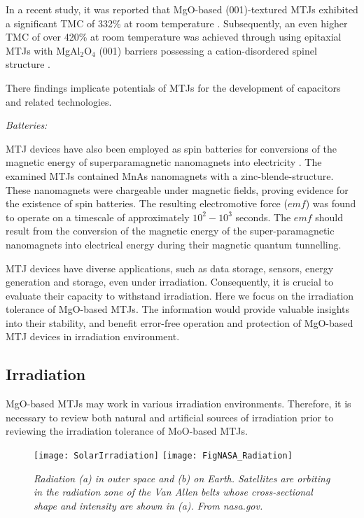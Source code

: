 \documentclass[molecules,review,submit,pdftex,moreauthors]{Definitions/mdpi}
\begin{document}
In a recent study, it was reported that MgO-based (001)-textured MTJs exhibited a significant TMC of \unit{332}{\%} at room temperature \cite{Sato2022SR}.  Subsequently, an even higher TMC of over \unit{420}{\%} at room temperature was achieved through using epitaxial MTJs with MgAl$_2$O$_4$ (001) barriers possessing a cation-disordered spinel structure \cite{Sato2022SR}. 


There findings implicate potentials of MTJs for the development of capacitors and related technologies.


\noindent \emph{Batteries:}


MTJ devices have also been employed as spin batteries for conversions of the magnetic energy of superparamagnetic nanomagnets into electricity \cite{Hai2009Nature}.  The examined MTJs contained MnAs nanomagnets with a zinc-blende-structure.  These nanomagnets were chargeable under magnetic fields, proving evidence for the existence of spin batteries.  The resulting electromotive force ($emf$) was found to operate on a timescale of approximately $10^2 - 10^3$ seconds.  The $emf$ should result from the conversion of the magnetic energy of the super-paramagnetic nanomagnets into electrical energy during their magnetic quantum tunnelling.


MTJ devices have diverse applications, such as data storage, sensors, energy generation and storage, even under irradiation.  Consequently, it is crucial to evaluate their capacity to withstand irradiation.  Here we focus on the irradiation tolerance of MgO-based MTJs.  The information would provide valuable insights into their stability, and benefit error-free operation and protection of MgO-based MTJ devices in  irradiation environment. 


\vspace{12pt}
\subsection{Irradiation}


MgO-based MTJs may work in various irradiation environments.  Therefore, it is necessary to review both natural and artificial sources of irradiation prior to reviewing the irradiation tolerance of MoO-based MTJs.


\begin{figure}
  \begin{center}
    \texttt{[image: SolarIrradiation]}
    \texttt{[image: FigNASA\_Radiation]}
  \end{center}
  \caption{\textit{Radiation (a) in outer space and (b) on Earth.  Satellites are orbiting in the radiation zone of the Van Allen belts whose cross-sectional shape and intensity are shown in (a).  From nasa.gov.}}
  \label{Fig:IrradiationSources}
\end{figure}
\end{document}
